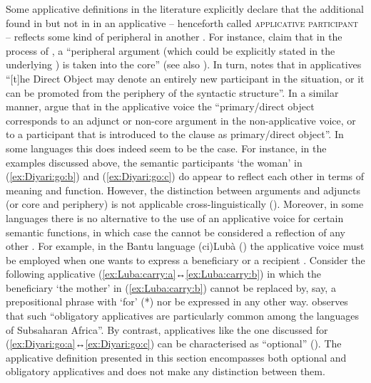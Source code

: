 Some applicative definitions in the literature explicitly declare that the additional  found in  but not in  in an applicative  -- henceforth called \textsc{applicative participant} -- reflects some kind of peripheral  in another . For instance, \cite[13]{dixon:aikhenvald:2000} claim that in the process of , a “peripheral argument (which could be explicitly stated in the underlying ) is taken into the core” (see also \citealt[32]{dixon:2000}). In turn, \cite[389]{kulikov:2010} notes that in applicatives “[t]he Direct Object may denote an entirely new participant in the situation, or it can be promoted from the periphery of the syntactic structure”. In a similar manner, \cite[53]{zuniga:kittila:2019} argue that in the applicative voice the “primary/direct object corresponds to an adjunct or non-core argument in the non-applicative voice, or to a participant that is introduced to the clause as primary/direct object”. In some languages this does indeed seem to be the case. For instance, in the  examples discussed above, the semantic participants ‘the woman’ in (\ref{ex:Diyari:go:b}) and (\ref{ex:Diyari:go:c}) do appear to reflect each other in terms of meaning and function. However, the distinction between arguments and adjuncts (or core and periphery) is not applicable cross-linguistically (). Moreover, in some languages there is no alternative to the use of an applicative voice for certain semantic functions, in which case the  cannot be considered a reflection of any other . For example, in the Bantu language (ci)Lubà () the applicative voice must be employed when one wants to express a beneficiary or a recipient \citep[104f., 107, 116]{de-kind:bostoen:2012}. Consider the following  applicative  (\ref{ex:Luba:carry:a}↔\ref{ex:Luba:carry:b}) in which the beneficiary ‘the mother’ in (\ref{ex:Luba:carry:b}) cannot be replaced by, say, a prepositional phrase with  ‘for’ (*) nor be expressed in any other way. \cite[85]{creissels:2016} observes that such “obligatory applicatives are particularly common among the languages of Subsaharan Africa”. By contrast, applicatives like the one discussed for  (\ref{ex:Diyari:go:a}↔\ref{ex:Diyari:go:c}) can be characterised as “optional” (\citealt[45ff.]{peterson:2007}). The applicative definition presented in this section encompasses both optional and obligatory applicatives and does not make any distinction between them.

